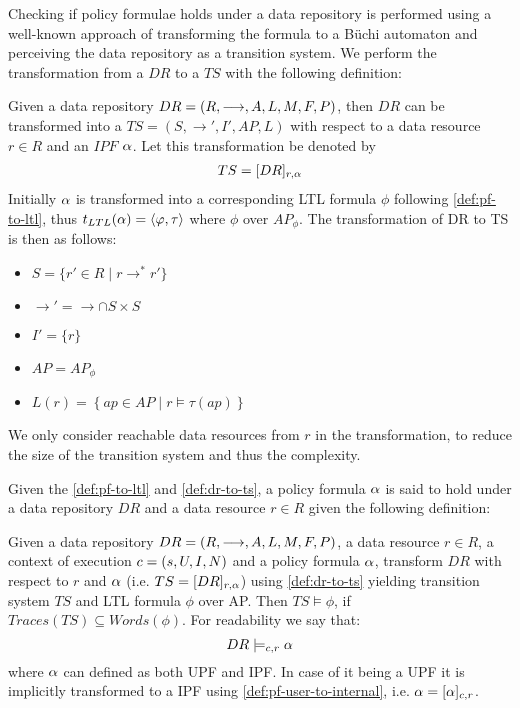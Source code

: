 Checking if policy formulae holds under a data repository is performed using a well-known approach of transforming the formula to a Büchi automaton and perceiving the data repository as a transition system. We perform the transformation from a $DR$ to a $TS$ with the following definition:
\begin{definition}\label{def:dr-to-ts}
Given a data repository $DR= \left( R, \longrightarrow, A, L, M, F, P \right)$, then $DR$ can be transformed into a $TS=\left(S, \longrightarrow', I', AP, L \right)$ with respect to a data resource $r \in R$ and an $IPF$ $\alpha$. Let this transformation be denoted by
\begin{align*}
    TS = [DR]_{r,\alpha}    
\end{align*}
Initially $\alpha$ is transformed into a corresponding LTL formula $\phi$ following \autoref{def:pf-to-ltl}, thus $t_{LTL}(\alpha) =  \langle \varphi, \tau \rangle$ where $\phi$ over $AP_\phi$. The transformation of DR to TS is then as follows:
\begin{itemize}
  \item $S = \{ r' \in R \mid r \longrightarrow^\ast r' \}$
  \item $\longrightarrow' = \longrightarrow \cap S \times S$
  \item $I' = \{r\}$
  \item $AP = AP_\phi$
  \item $L(r) = \left\{ ap \in AP \mid r \models \tau(ap) \right\}$
\end{itemize}
We only consider reachable data resources from $r$ in the transformation, to reduce the size of the transition system and thus the complexity.
\end{definition}
Given the \autoref{def:pf-to-ltl} and \autoref{def:dr-to-ts}, a policy formula $\alpha$ is said to hold under a data repository $DR$ and a data resource $r \in R$ given the following definition:
\begin{definition}
Given a data repository $DR= \left( R, \longrightarrow, A, L, M, F, P \right)$, a data resource $r \in R$, a context of execution $c = \left( s, U, I, N \right)$ and a policy formula $\alpha$, transform $DR$ with respect to $r$ and $\alpha$ (i.e. $TS = [DR]_{r,\alpha}$) using \autoref{def:dr-to-ts} yielding transition system $TS$ and LTL formula $\phi$ over AP. Then $TS \models \phi$, if $Traces(TS) \subseteq Words(\phi)$. For readability we say that:
\begin{equation*}
    DR \models_{c,r} \alpha
\end{equation*}
where $\alpha$ can defined as both UPF and IPF. In case of it being a UPF it is implicitly transformed to a IPF using \autoref{def:pf-user-to-internal}, i.e. $\alpha = [\alpha]_{c,r}$.
\end{definition}